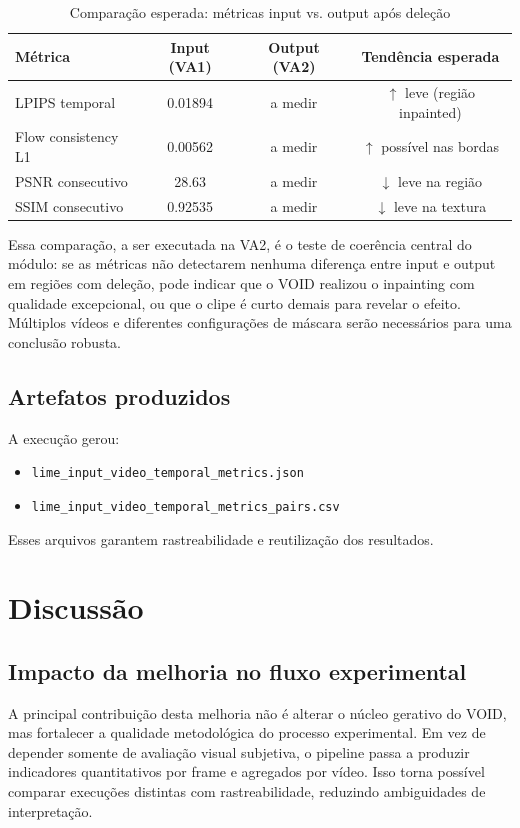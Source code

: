 \documentclass[conference]{IEEEtran}
\begin{document}
\begin{table}[H]
\caption{Comparação esperada: métricas input vs. output após deleção}
\label{tab:input_vs_output}
\centering
\begin{tabular}{lccc}
\toprule
\textbf{Métrica} & \textbf{Input (VA1)} & \textbf{Output (VA2)} & \textbf{Tendência esperada} \\
\midrule
LPIPS temporal       & 0.01894 & a medir & $\uparrow$ leve (região inpainted) \\
Flow consistency L1  & 0.00562 & a medir & $\uparrow$ possível nas bordas \\
PSNR consecutivo     & 28.63   & a medir & $\downarrow$ leve na região \\
SSIM consecutivo     & 0.92535 & a medir & $\downarrow$ leve na textura \\
\bottomrule
\end{tabular}
\end{table}

Essa comparação, a ser executada na VA2, é o teste de coerência central do módulo: se as métricas não detectarem nenhuma diferença entre input e output em regiões com deleção, pode indicar que o VOID realizou o inpainting com qualidade excepcional, ou que o clipe é curto demais para revelar o efeito. Múltiplos vídeos e diferentes configurações de máscara serão necessários para uma conclusão robusta.

\subsection{Artefatos produzidos}
A execução gerou:
\begin{itemize}
    \item \texttt{lime\_input\_video\_temporal\_metrics.json}
    \item \texttt{lime\_input\_video\_temporal\_metrics\_pairs.csv}
\end{itemize}
Esses arquivos garantem rastreabilidade e reutilização dos resultados.

\section{Discussão}
\subsection{Impacto da melhoria no fluxo experimental}
A principal contribuição desta melhoria não é alterar o núcleo gerativo do VOID, mas fortalecer a qualidade metodológica do processo experimental. Em vez de depender somente de avaliação visual subjetiva, o pipeline passa a produzir indicadores quantitativos por frame e agregados por vídeo. Isso torna possível comparar execuções distintas com rastreabilidade, reduzindo ambiguidades de interpretação.
\end{document}
